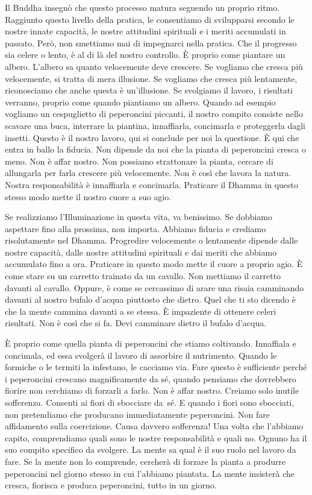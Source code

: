 Il Buddha insegnò che questo processo matura seguendo un proprio ritmo.
Raggiunto questo livello della pratica, le consentiamo di svilupparsi
secondo le nostre innate capacità, le nostre attitudini spirituali e i
meriti accumulati in passato. Però, non smettiamo mai di impegnarci
nella pratica. Che il progresso sia celere o lento, è al di là del
nostro controllo. È proprio come piantare un albero. L'albero sa quanto
velocemente deve crescere. Se vogliamo che cresca più velocemente, si
tratta di mera illusione. Se vogliamo che cresca più lentamente,
riconosciamo che anche questa è un'illusione. Se svolgiamo il lavoro, i
risultati verranno, proprio come quando piantiamo un albero. Quando ad
esempio vogliamo un cespuglietto di peperoncini piccanti, il nostro
compito consiste nello scavare una buca, interrare la piantina,
innaffiarla, concimarla e proteggerla dagli insetti. Questo è il nostro
lavoro, qui si conclude per noi la questione. È qui che entra in ballo
la fiducia. Non dipende da noi che la pianta di peperoncini cresca o
meno. Non è affar nostro. Non possiamo strattonare la pianta, cercare di
allungarla per farla crescere più velocemente. Non è così che lavora la
natura. Nostra responsabilità è innaffiarla e concimarla. Praticare il
Dhamma in questo stesso modo mette il nostro cuore a suo agio.

Se realizziamo l'Illuminazione in questa vita, va benissimo. Se dobbiamo
aspettare fino alla prossima, non importa. Abbiamo fiducia e crediamo
risolutamente nel Dhamma. Progredire velocemente o lentamente dipende
dalle nostre capacità, dalle nostre attitudini spirituali e dai meriti
che abbiamo accumulato fino a ora. Praticare in questo modo mette il
cuore a proprio agio. È come stare su un carretto trainato da un
cavallo. Non mettiamo il carretto davanti al cavallo. Oppure, è come se
cercassimo di arare una risaia camminando davanti al nostro bufalo
d'acqua piuttosto che dietro. Quel che ti sto dicendo è che la mente
cammina davanti a se stessa. È impaziente di ottenere celeri risultati.
Non è così che si fa. Devi camminare dietro il bufalo d'acqua.

\enlargethispage{-\baselineskip}

È proprio come quella pianta di peperoncini che stiamo coltivando.
Innaffiala e concimala, ed essa svolgerà il lavoro di assorbire il
nutrimento. Quando le formiche o le termiti la infestano, le cacciamo
via. Fare questo è sufficiente perché i peperoncini crescano
magnificamente da sé, quando pensiamo che dovrebbero fiorire non
cerchiamo di forzarli a farlo. Non è affar nostro. Creiamo solo inutile
sofferenza. Consenti ai fiori di sbocciare da~sé. E quando i fiori sono
sbocciati, non pretendiamo che producano immediatamente peperoncini. Non
fare affidamento sulla coercizione. Causa davvero sofferenza! Una volta
che l'abbiamo capito, comprendiamo quali sono le nostre responsabilità e
quali no. Ognuno ha il suo compito specifico da svolgere. La mente sa
qual è il suo ruolo nel lavoro da fare. Se la mente non lo comprende,
cercherà di forzare la pianta a produrre peperoncini nel giorno stesso
in cui l'abbiamo piantata. La mente insisterà che cresca, fiorisca e
produca peperoncini, tutto in un giorno.

